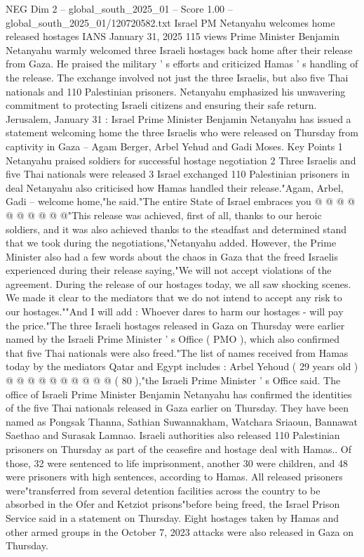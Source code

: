 \begin{textsample}{NEG Dim 2 – global\_south\_2025\_01 – Score 1.00 – global\_south\_2025\_01/120720582.txt}  \label{ex:f2_neg_114}
Israel PM Netanyahu welcomes home released hostages IANS January 31, 2025 115 views Prime Minister Benjamin Netanyahu warmly welcomed three Israeli hostages back home after their release from Gaza.
He praised the military ' s efforts and criticized Hamas ' s handling of the release.
The exchange involved not just the three Israelis, but also five Thai nationals and 110 Palestinian prisoners.
Netanyahu emphasized his unwavering commitment to protecting Israeli citizens and ensuring their safe return.
Jerusalem, January 31 : Israel Prime Minister Benjamin Netanyahu has issued a statement welcoming home the three Israelis who were released on Thursday from captivity in Gaza -- Agam Berger, Arbel Yehud and Gadi Moses.
Key Points 1 Netanyahu praised soldiers for successful hostage negotiation 2 Three Israelis and five Thai nationals were released 3 Israel exchanged 110 Palestinian prisoners in deal Netanyahu also criticised how Hamas handled their release."Agam, Arbel, Gadi -- welcome home,"he said."The entire State of Israel embraces you @ @ @ @ @ @ @ @ @ @"This release was achieved, first of all, thanks to our heroic soldiers, and it was also achieved thanks to the steadfast and determined stand that we took during the negotiations,"Netanyahu added.
However, the Prime Minister also had a few words about the chaos in Gaza that the freed Israelis experienced during their release saying,"We will not accept violations of the agreement.
During the release of our hostages today, we all saw shocking scenes.
We made it clear to the mediators that we do not intend to accept any risk to our hostages.""And I will add : Whoever dares to harm our hostages - will pay the price."The three Israeli hostages released in Gaza on Thursday were earlier named by the Israeli Prime Minister ' s Office ( PMO ), which also confirmed that five Thai nationals were also freed."The list of names received from Hamas today by the mediators Qatar and Egypt includes : Arbel Yehoud ( 29 years old ) @ @ @ @ @ @ @ @ @ @ ( 80 ),"the Israeli Prime Minister ' s Office said.
The office of Israeli Prime Minister Benjamin Netanyahu has confirmed the identities of the five Thai nationals released in Gaza earlier on Thursday.
They have been named as Pongsak Thanna, Sathian Suwannakham, Watchara Sriaoun, Bannawat Saethao and Surasak Lamnao.
Israeli authorities also released 110 Palestinian prisoners on Thursday as part of the ceasefire and hostage deal with Hamas..
Of those, 32 were sentenced to life imprisonment, another 30 were children, and 48 were prisoners with high sentences, according to Hamas.
All released prisoners were"transferred from several detention facilities across the country to be absorbed in the Ofer and Ketziot prisons"before being freed, the Israel Prison Service said in a statement on Thursday.
Eight hostages taken by Hamas and other armed groups in the October 7, 2023 attacks were also released in Gaza on Thursday.

\end{textsample}
